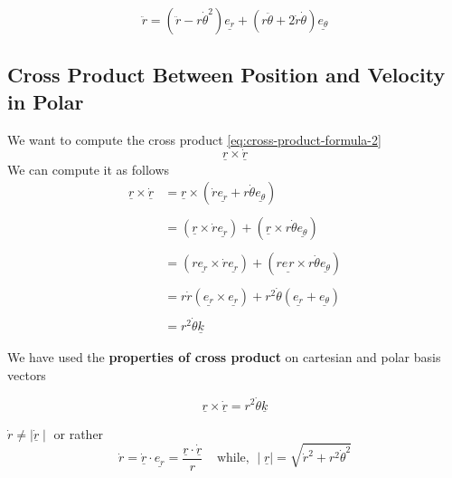 \begin{definition}
	\begin{equation}
		\label{eq: velocity-acceleration}
		\ddot{r} = (\ddot{r} - r\dot{\theta}^{2})\underline{e_{r}} + (r\ddot{\theta} + 2\dot{r}\dot{\theta})\underline{e_{\theta}}
	\end{equation}
\end{definition}

\subsection{Cross Product Between Position and Velocity in Polar}
We want to compute the cross product \ref{eq:cross-product-formula-2}
$$\underline{r} \times \underline{\dot{r}}$$
We can compute it as follows
$$\begin{aligned} \underline{r} \times \underline{\dot{r}} & = \underline{r} \times (\dot{r} \underline{e_{r}}+ r\dot{\theta}\underline{e_{\theta}})                                     \\ \\
                                                         & = (\underline{r} \times \dot{r}\underline{{e_{r}}}) + (\underline{r} \times r\dot{\theta}\underline{e_{\theta}})            \\ \\
                                                         & =  (r\underline{e_{r}} \times \dot{r}\underline{{e_{r}}}) + (r\underline{e_{}r} \times r\dot{\theta}\underline{e_{\theta}}) \\ \\
                                                         & =  r\dot{r}(\underline{e_{r}}\times \underline{e_{r}}) + r^{2}\dot{\theta}(\underline{e_{r}}+ \underline{e_{\theta}})       \\ \\
                                                         & = r^{2}\dot{\theta}\underline{k}\end{aligned}$$

\begin{note}
	We have used the {\bf properties of cross product} on {cartesian and polar basis vectors}

\end{note}

\begin{definition}
	\begin{equation}
		\label{eq: plolar-cross-vel-pos}
		\underline{r} \times \underline{\dot{r}} =  r^{2}\dot{\theta}\underline{k}
	\end{equation}
\end{definition}

\begin{note}
	$\dot{r} \neq \mid \underline{\dot{r}} \mid$ or rather
	$$\dot{r} = \underline{\dot{r}} \cdot \underline{e_{r}} = \frac{\underline{r}\cdot\underline{\dot{r}}}{r} \ \ \ \ \ \text{while, } \mid\underline{r} \mid = \sqrt{\dot{r}^2+r^2\dot{\theta}^2}$$

\end{note}
